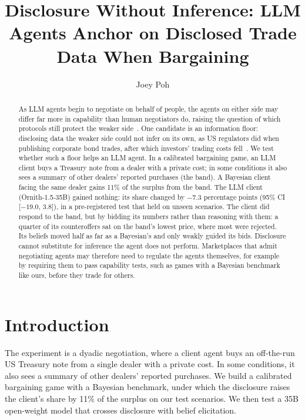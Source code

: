 \documentclass[sigconf]{acmart}
\begin{document}
\title{Disclosure Without Inference: LLM Agents Anchor on Disclosed Trade Data When Bargaining}

\author{Joey Poh}

\begin{abstract}
As LLM agents begin to negotiate on behalf of people, the agents on either side may differ far more in capability than human negotiators do, raising the question of which protocols still protect the weaker side~\cite{agiinstitutions2026negotiation}. One candidate is an information floor: disclosing data the weaker side could not infer on its own, as US regulators did when publishing corporate bond trades, after which investors' trading costs fell~\cite{goldstein2007transparency}. We test whether such a floor helps an LLM agent. In a calibrated bargaining game, an LLM client buys a Treasury note from a dealer with a private cost; in some conditions it also sees a summary of other dealers' reported purchases (the band). A Bayesian client facing the same dealer gains 11\% of the surplus from the band. The LLM client (Ornith-1.5-35B) gained nothing: its share changed by $-7.3$ percentage points (95\% CI [$-19.0$, $3.8$]), in a pre-registered test that held on unseen scenarios. The client did respond to the band, but by bidding its numbers rather than reasoning with them: a quarter of its counteroffers sat on the band's lowest price, where most were rejected. Its beliefs moved half as far as a Bayesian's and only weakly guided its bids. Disclosure cannot substitute for inference the agent does not perform. Marketplaces that admit negotiating agents may therefore need to regulate the agents themselves, for example by requiring them to pass capability tests, such as games with a Bayesian benchmark like ours, before they trade for others.
\end{abstract}

\maketitle
\setlength{\parskip}{0.3\baselineskip}
\section{Introduction}

The experiment is a dyadic negotiation, where a client agent buys an off-the-run US Treasury note from a single dealer with a private cost. In some conditions, it also sees a summary of other dealers' reported purchases. We build a calibrated bargaining game with a Bayesian benchmark, under which the disclosure raises the client's share by 11\% of the surplus on our test scenarios. We then test a 35B open-weight model that crosses disclosure with belief elicitation.
\end{document}
